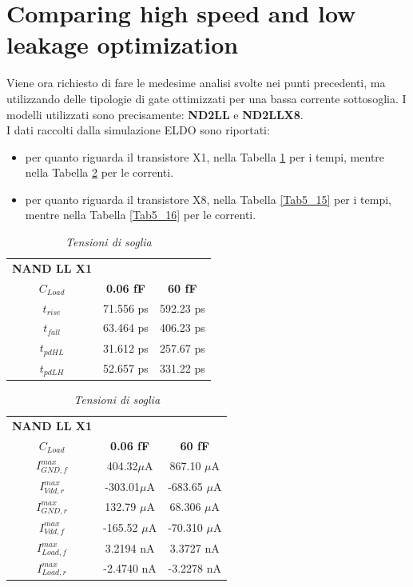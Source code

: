 \section{Comparing high speed and low leakage optimization}
Viene ora richiesto di fare le medesime analisi svolte nei punti precedenti, ma utilizzando delle tipologie di gate ottimizzati per una bassa corrente sottosoglia. I modelli utilizzati sono precisamente: \textbf{ND2LL} e \textbf{ND2LLX8}. \\
I dati raccolti dalla simulazione ELDO sono riportati:
\begin{itemize}
	\item per quanto riguarda il transistore X1, nella Tabella \ref{Tab5_13} per i tempi, mentre nella Tabella \ref{Tab5_14} per le correnti.
	\item per quanto riguarda il transistore X8, nella Tabella \ref{Tab5_15} per i tempi, mentre nella Tabella \ref{Tab5_16} per le correnti.
\end{itemize}
\begin{table}[!h]\footnotesize
	\centering
	\begin{tabular}{|c|c|c|}
		\hline
		\textbf{NAND LL X1} & &\\
		\textbf{$C_{Load}$} & \textbf{0.06 fF} & \textbf{60 fF}\\
		\hline
		$t_{rise}$ &71.556 ps&592.23 ps  \\
		
		$t_{fall}$ &63.464 ps &406.23 ps  \\
		
		$t_{pdHL}$&31.612 ps &257.67 ps  \\
		
		$t_{pdLH}$ &52.657 ps&331.22 ps  \\
		
		\hline
	\end{tabular}
	\caption{\textit{Tensioni di soglia}}
	\label{Tab5_13}
\end{table}
\begin{table}[!h]\footnotesize
	\centering
	\begin{tabular}{|c|c|c|}
		\hline
		\textbf{NAND LL X1} & &\\
		\textbf{$C_{Load}$} & \textbf{0.06 fF} & \textbf{60 fF}\\
		\hline
		$I_{GND, f}^{max}$ &404.32$\mu$A &867.10 $\mu$A\\
		
		$I_{Vdd, r}^{max}$ &-303.01$\mu$A &-683.65 $\mu$A \\
		
		$I_{GND, r}^{max}$&132.79 $\mu$A &68.306 $\mu$A\\
		
		$I_{Vdd, f}^{max}$&-165.52 $\mu$A&-70.310 $\mu$A \\
		
		$I_{Load, f}^{max}$ &3.2194 nA &3.3727 nA \\
		
		$I_{Load, r}^{max}$ &-2.4740 nA &-3.2278 nA  \\
		\hline
	\end{tabular}
	\caption{\textit{Tensioni di soglia}}
	\label{Tab5_14}
\end{table}
